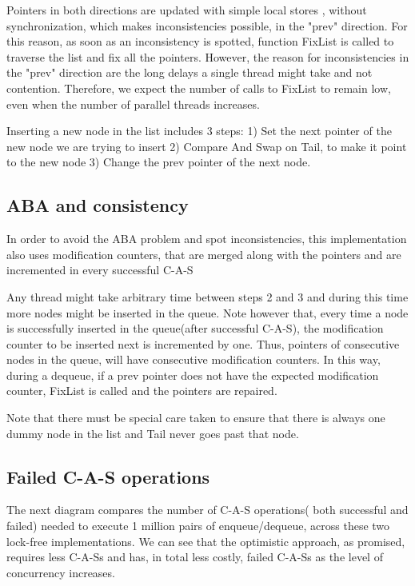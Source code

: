 Pointers in both directions are updated with simple local stores , without synchronization, which makes inconsistencies possible, in the "prev" direction. For this reason, as soon as an inconsistency is spotted, function FixList is called to traverse the list and fix all the pointers. However, the reason for inconsistencies in the "prev" direction are the long delays a single thread might take and not contention. Therefore, we expect the number of calls to FixList to remain low, even when the number of parallel threads increases.

Inserting a new node in the list includes 3 steps:
1) Set the next pointer of the new node we are trying to insert
2) Compare And Swap on Tail, to make it point to the new node
3) Change the prev pointer of the next node.

\subsection{ABA and consistency}

In order to avoid the ABA problem and spot inconsistencies, this implementation also uses modification counters, that are merged along with the pointers and are incremented in every successful C-A-S

Any thread might take arbitrary time  between steps 2 and 3 and during this time more nodes might be inserted in the queue. Note however that, every time a node is successfully inserted in the queue(after successful C-A-S), the modification counter to be inserted next is incremented by one. Thus, pointers of consecutive nodes in the queue, will have consecutive modification counters. In this way, during a dequeue, if a prev pointer does not have the expected modification counter, FixList is called and the pointers are repaired.

Note that there must be special care taken to ensure that there is always one dummy node in the list and Tail never goes past that node.

\subsection{Failed C-A-S operations}

The next diagram compares the number of C-A-S operations( both successful and failed) needed to execute 1 million pairs of enqueue/dequeue, across these two lock-free implementations. We can see that the optimistic approach, as promised, requires less C-A-Ss and has, in total less costly, failed C-A-Ss as the level of concurrency increases.

